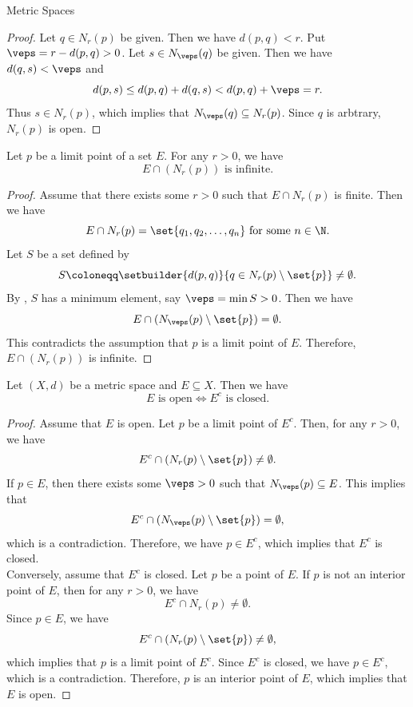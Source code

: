 \begin{section}{Metric Spaces}
\begin{proof}
    Let $q \in N_{r}(p)$ be given. Then we have $d(p, q) < r$. Put $\veps = r - d(p, q) > 0$.
    Let $s \in N_{\veps}(q)$ be given. Then we have $d(q, s) < \veps$ and
    \[
    d(p, s) \leq d(p, q) + d(q, s) < d(p, q) + \veps = r.
    \]
    Thus $s \in N_{r}(p)$, which implies that $N_{\veps}(q) \subseteq N_{r}(p)$. Since $q$ is arbtrary, $N_{r}(p)$ is open.
\end{proof}

\bigskip

\begin{theorem} \label{thm:LimitPointNeighborhoodIsInfinite}
    Let $p$ be a limit point of a set $E$. For any $r > 0$, we have
    \[
    E \cap (N_{r}(p)) \text{ is infinite.}
    \]
\end{theorem}

\begin{proof}
    Assume that there exists some $r > 0$ such that $E \cap N_{r}(p)$ is finite. Then we have
    \[
    E \cap N_{r}(p) = \set{q_{1}, q_{2}, \dots, q_{n}} \text{ for some } n \in \N.
    \]
    Let $S$ be a set defined by
    \[
    S \coloneqq \setbuilder{d(p, q)}{q \in N_{r}(p) \setminus \set{p}} \neq \emptyset.
    \]
    By ,  $S$ has a minimum element,
    say $\veps = \min S > 0$. Then we have
    \[
    E \cap (N_{\veps}(p) \setminus \set{p}) = \emptyset.
    \]
    This contradicts the assumption that $p$ is a limit point of $E$. Therefore, $E \cap (N_{r}(p))$ is infinite.
\end{proof}

\bigskip

\begin{theorem} \label{thm:OpenSetComplementIsClosedSet}
    Let $(X, d)$ be a metric space and $E \subseteq X$. Then we have
    \[
    E \text{ is open} \iff E^{c} \text{ is closed.}
    \]
\end{theorem}

\begin{proof}
    Assume that $E$ is open. Let $p$ be a limit point of $E^{c}$. Then, for any $r > 0$, we have
    \[
    E^{c} \cap (N_{r}(p) \setminus \set{p}) \neq \emptyset.
    \]
    If $p \in E$, then there exists some $\veps > 0$ such that $N_{\veps}(p) \subseteq E$. This implies that
    \[
    E^{c} \cap (N_{\veps}(p) \setminus \set{p}) = \emptyset,
    \]
    which is a contradiction. Therefore, we have $p \in E^{c}$, which implies that $E^{c}$ is closed.
    \\[6mm]
    Conversely, assume that $E^{c}$ is closed. Let $p$ be a point of $E$. If $p$ is not an interior point of $E$,
    then for any $r > 0$, we have
    \[
    E^{c} \cap N_{r}(p) \neq \emptyset.
    \]
    Since $p \in E$, we have
    \[
    E^{c} \cap (N_{r}(p) \setminus \set{p}) \neq \emptyset,
    \]
    which implies that $p$ is a limit point of $E^{c}$. Since $E^{c}$ is closed, we have $p \in E^{c}$,
    which is a contradiction. Therefore, $p$ is an interior point of $E$, which implies that $E$ is open.
\end{proof}


\end{section}
